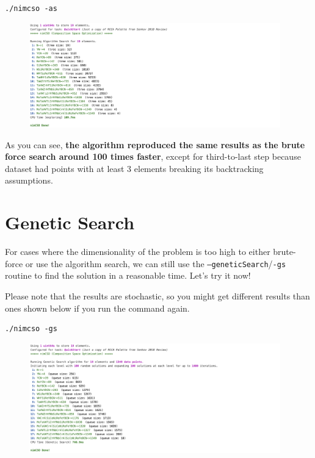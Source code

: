 \begin{verbatim}
./nimcso -as
\end{verbatim}

\begin{figure}[H]
  \centering
  \includegraphics[width=0.97\textwidth]{nimcsotutorial/7.png}
\end{figure}

As you can see, \textbf{the algorithm reproduced the same results as the
brute force search around 100 times faster}, except for third-to-last
step because dataset had points with at least 3 elements breaking its
backtracking assumptions.

\hypertarget{genetic-search}{%
\section{Genetic Search}\label{nimcsotutorial:genetic-search}}

For cases where the dimensionality of the problem is too high to either
brute-force or use the algorithm search, we can still use the
\texttt{--geneticSearch}/\texttt{-gs}
routine to find the solution in a reasonable time. Let's try it now!

Please note that the results are stochastic, so you might get different
results than ones shown below if you run the command again.

\begin{verbatim}
./nimcso -gs
\end{verbatim}

\begin{figure}[H]
  \centering
  \includegraphics[width=0.97\textwidth]{nimcsotutorial/8.png}
\end{figure}

